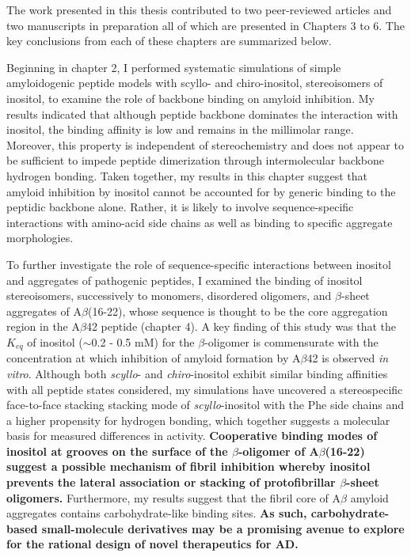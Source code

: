 The work presented in this thesis contributed to two peer-reviewed articles and two manuscripts in preparation all of which are presented in Chapters 3 to 6.  The key conclusions from each of these chapters are summarized below.

Beginning in chapter 2, I performed systematic simulations of simple amyloidogenic peptide models with scyllo- and chiro-inositol, stereoisomers of inositol, to examine the role of backbone binding on amyloid inhibition. My results indicated that although peptide backbone dominates the interaction with inositol, the binding affinity is low and remains in the millimolar range. Moreover, this property is independent of stereochemistry and does not appear to be sufficient to impede peptide dimerization through intermolecular backbone hydrogen bonding. Taken together, my results in this chapter suggest that amyloid inhibition by inositol cannot be accounted for by generic binding to the peptidic backbone alone. Rather, it is likely to involve sequence-specific interactions with amino-acid side chains as well as binding to specific aggregate morphologies.

To further investigate the role of sequence-specific interactions between inositol and aggregates of pathogenic peptides, I examined the binding of  inositol stereoisomers, successively to monomers, disordered oligomers, and $\beta$-sheet aggregates of A$\beta$(16-22), whose sequence is thought to be the core aggregation region in the A$\beta$42 peptide (chapter 4). A key finding of this study was that the $K_{eq}$ of inositol ($\sim$0.2 - 0.5 mM) for the $\beta$-oligomer is commensurate with the concentration at which inhibition of amyloid formation by A$\beta$42 is observed \emph{in vitro}. Although both \emph{scyllo}- and \emph{chiro}-inositol exhibit similar binding affinities with all peptide states considered, my simulations have uncovered a stereospecific face-to-face stacking stacking mode of \emph{scyllo}-inositol with the Phe side chains and a higher propensity for hydrogen bonding, which together suggests a molecular basis for measured differences in activity. \textbf{Cooperative binding modes of inositol at grooves on the surface of the $\beta$-oligomer of A$\beta$(16-22) suggest a possible mechanism of fibril inhibition whereby inositol prevents the lateral association or stacking of protofibrillar $\beta$-sheet oligomers.} Furthermore, my results suggest that the fibril core of A$\beta$ amyloid aggregates contains carbohydrate-like binding sites.  \textbf{As such, carbohydrate-based small-molecule derivatives may be a promising avenue to explore for the rational design of novel therapeutics for AD.}

